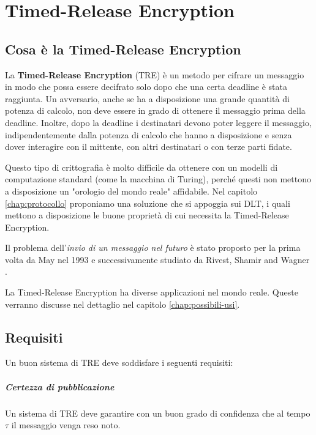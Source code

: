 \chapter{Timed-Release Encryption}

\section{Cosa è la Timed-Release Encryption}
La \textbf{Timed-Release Encryption} (TRE)
è un metodo per cifrare un messaggio in modo che possa
essere decifrato solo dopo che una certa deadline è stata raggiunta.
Un avversario, anche se ha a disposizione una grande quantità di potenza di calcolo,
non deve essere in grado di ottenere il messaggio prima della deadline.
Inoltre, dopo la deadline i destinatari devono poter leggere il messaggio,
indipendentemente dalla potenza di calcolo che hanno a disposizione e
senza dover interagire con il mittente,
con altri destinatari o con terze parti fidate.

Questo tipo di crittografia è molto difficile da ottenere con un modelli
di computazione standard (come la macchina di Turing), perché questi non mettono
a disposizione un "orologio del mondo reale" affidabile.
Nel capitolo \ref{chap:protocollo} proponiamo una soluzione che si appoggia sui DLT,
i quali mettono a disposizione
le buone proprietà di cui necessita la Timed-Release Encryption.

Il problema dell'\textit{invio di un messaggio nel futuro} è stato proposto per la prima volta
da May \cite{May:time-released-crypto} nel 1993 e
successivamente studiato da Rivest, Shamir and Wagner \cite{Rivest96time-lockpuzzles}.

La Timed-Release Encryption ha diverse applicazioni nel mondo reale. Queste verranno
discusse nel dettaglio nel capitolo \ref{chap:possibili-usi}.

\section{Requisiti}
Un buon sistema di TRE deve soddisfare i seguenti requisiti:

\paragraph{Certezza di pubblicazione}
\label{parag:certezza-pubblicazione}
Un sistema di TRE deve garantire con un buon
grado di confidenza che al tempo $ \tau $ il messaggio venga reso noto.

